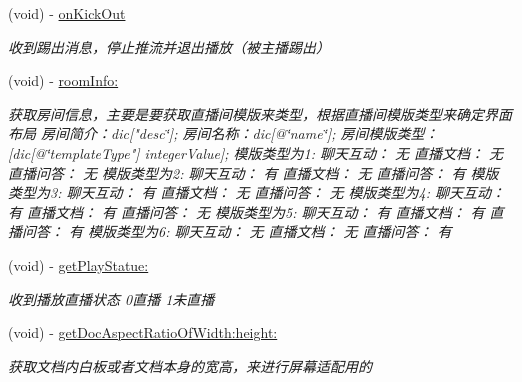 \begin{DoxyCompactItemize}
\mbox{\label{protocol_request_data_delegate_01-p_acaeb6327cf94945d0961ce485d63179d}} 
(void) -\/ \hyperlink{protocol_request_data_delegate_01-p_acaeb6327cf94945d0961ce485d63179d}{on\+Kick\+Out}
\begin{DoxyCompactList}\small\item\em 收到踢出消息，停止推流并退出播放（被主播踢出） \end{DoxyCompactList}\item 
\mbox{\label{protocol_request_data_delegate_01-p_ac7e7129cc172dba4b35a4bf35a86ae16}} 
(void) -\/ \hyperlink{protocol_request_data_delegate_01-p_ac7e7129cc172dba4b35a4bf35a86ae16}{room\+Info\+:}
\begin{DoxyCompactList}\small\item\em 获取房间信息，主要是要获取直播间模版来类型，根据直播间模版类型来确定界面布局 房间简介：dic\mbox{[}"desc\char`\"{}\mbox{]};
房间名称：dic\mbox{[}@\char`\"{}name\char`\"{}\mbox{]};
房间模版类型：\mbox{[}dic\mbox{[}@\char`\"{}template\+Type"\mbox{]} integer\+Value\mbox{]}; 模版类型为1\+: 聊天互动： 无 直播文档： 无 直播问答： 无 模版类型为2\+: 聊天互动： 有 直播文档： 无 直播问答： 有 模版类型为3\+: 聊天互动： 有 直播文档： 无 直播问答： 无 模版类型为4\+: 聊天互动： 有 直播文档： 有 直播问答： 无 模版类型为5\+: 聊天互动： 有 直播文档： 有 直播问答： 有 模版类型为6\+: 聊天互动： 无 直播文档： 无 直播问答： 有 \end{DoxyCompactList}\item 
\mbox{\label{protocol_request_data_delegate_01-p_ad968ef491836696e905e599e3a412ea4}} 
(void) -\/ \hyperlink{protocol_request_data_delegate_01-p_ad968ef491836696e905e599e3a412ea4}{get\+Play\+Statue\+:}
\begin{DoxyCompactList}\small\item\em 收到播放直播状态 0直播 1未直播 \end{DoxyCompactList}\item 
\mbox{\label{protocol_request_data_delegate_01-p_ac4d791a2d5293df912eb07d8b3073829}} 
(void) -\/ \hyperlink{protocol_request_data_delegate_01-p_ac4d791a2d5293df912eb07d8b3073829}{get\+Doc\+Aspect\+Ratio\+Of\+Width\+:height\+:}
\begin{DoxyCompactList}\small\item\em 获取文档内白板或者文档本身的宽高，来进行屏幕适配用的 \end{DoxyCompactList}\item 

\end{DoxyCompactItemize}
